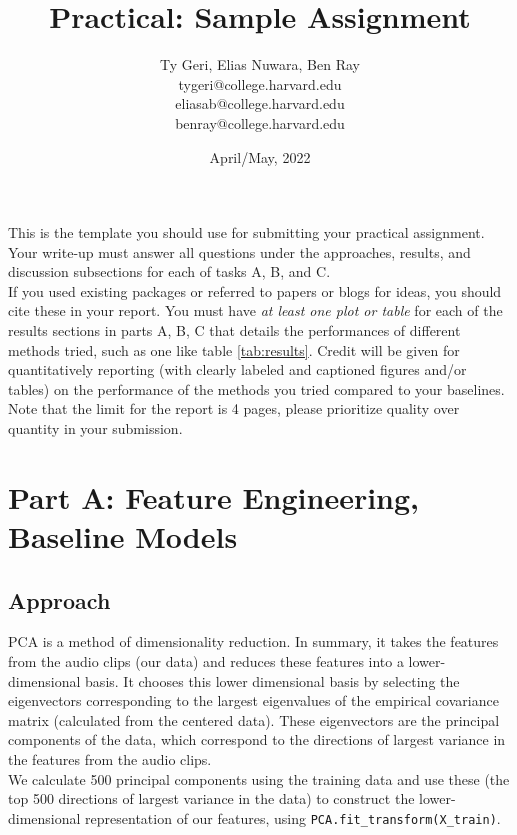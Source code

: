 \documentclass[11pt]{article}
\title{Practical: Sample Assignment}
\author{Ty Geri, Elias Nuwara, Ben Ray \\ tygeri@college.harvard.edu\\
eliasab@college.harvard.edu\\
benray@college.harvard.edu}
\date{April/May, 2022}
\begin{document}
\maketitle{}


\noindent This is the template you should use for submitting your practical assignment. 
Your write-up must
answer all questions under the approaches, results, and discussion subsections
for each of tasks A, B, and C. \\

\noindent If you used existing packages or referred to papers or blogs for ideas,  you should cite these in your report.  You must have \textit{at least one plot or table}
for each of the results sections in parts A, B, C
that details the performances of different methods tried, such as one like table \ref{tab:results}. Credit will be given for quantitatively reporting (with clearly
labeled and captioned figures and/or tables) on the performance of the
methods you tried compared to your baselines.\\

\noindent Note that the limit for the report is 4 pages, please prioritize quality over 
quantity in your submission.\\

\section{Part A: Feature Engineering, Baseline Models}

\subsection{Approach}
PCA is a method of dimensionality reduction. In summary, it takes the features from the audio clips (our data) and reduces these features into a lower-dimensional basis. It chooses this lower dimensional basis by selecting the eigenvectors corresponding to the largest eigenvalues of the empirical covariance matrix (calculated from the centered data). These eigenvectors are the principal components of the data, which correspond to the directions of largest variance in the features from the audio clips.\\

\noindent We calculate 500 principal components using the training data and use these (the top 500 directions of largest variance in the data) to construct the lower-dimensional representation of our features, using \texttt{PCA.fit\_transform(X\_train)}.\\
\end{document}
